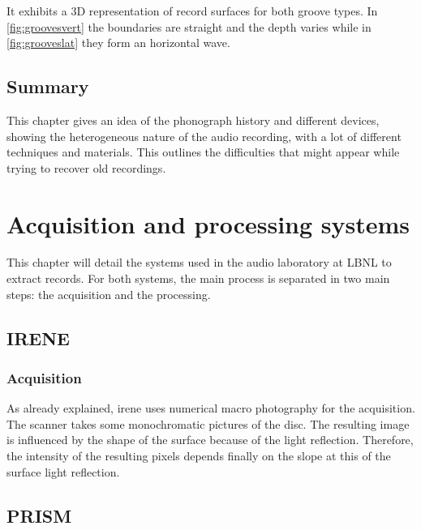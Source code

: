 It exhibits a 3D representation of record surfaces for both groove types. In \autoref{fig:groovesvert} the boundaries are straight and the depth  varies while in \autoref{fig:grooveslat} they form an horizontal wave.

\section{Summary}

This chapter gives an idea of the phonograph history and different devices, showing the heterogeneous nature of the audio recording, with a lot of different techniques and materials. This outlines the difficulties that might appear while trying to recover old recordings.

\chapter{Acquisition and processing systems}

This chapter will detail the systems used in the audio laboratory at LBNL to extract records. For both systems, the main process is separated in two main steps: the acquisition and the processing.

\section{IRENE}

\subsection{Acquisition}

As already explained, \gls{irene} uses numerical macro photography for the acquisition. The scanner takes some monochromatic pictures of the disc. The resulting image is influenced by the shape of the surface because of the light reflection. Therefore, the intensity of the resulting pixels depends finally on the slope at this of the surface light reflection.



\section{PRISM}

